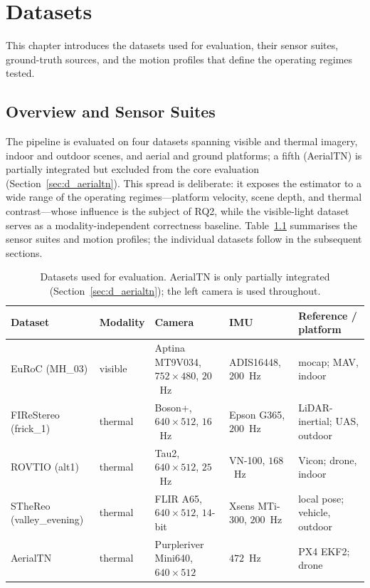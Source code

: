 \chapter{Datasets}
\label{ch:datasets}

This chapter introduces the datasets used for evaluation, their sensor suites, ground-truth sources, and the motion profiles that define the operating regimes tested.

\section{Overview and Sensor Suites}
\label{sec:d_overview}
The pipeline is evaluated on four datasets spanning visible and thermal imagery, indoor and outdoor scenes, and aerial and ground platforms; a fifth (AerialTN) is partially integrated but excluded from the core evaluation (Section~\ref{sec:d_aerialtn}). This spread is deliberate: it exposes the estimator to a wide range of the operating regimes---platform velocity, scene depth, and thermal contrast---whose influence is the subject of RQ2, while the visible-light dataset serves as a modality-independent correctness baseline. Table~\ref{tab:d_overview} summarises the sensor suites and motion profiles; the individual datasets follow in the subsequent sections.

\begin{table}[htbp]
\centering
\footnotesize
\setlength{\tabcolsep}{5pt}
\caption{Datasets used for evaluation. AerialTN is only partially integrated (Section~\ref{sec:d_aerialtn}); the left camera is used throughout.}
\label{tab:d_overview}
\begin{tabularx}{\textwidth}{@{}l l >{\raggedright\arraybackslash}X l >{\raggedright\arraybackslash}X@{}}
\toprule
\textbf{Dataset} & \textbf{Modality} & \textbf{Camera} & \textbf{IMU} & \textbf{Reference / platform} \\
\midrule
EuRoC (MH\_03)            & visible  & Aptina MT9V034, $752\times480$, $20$~Hz         & ADIS16448, $200$~Hz     & mocap; MAV, indoor \\
FIReStereo (frick\_1)     & thermal  & Boson+, $640\times512$, $16$~Hz & Epson G365, $200$~Hz    & LiDAR-inertial; UAS, outdoor \\
ROVTIO (alt1)             & thermal  & Tau2, $640\times512$, $25$~Hz   & VN-100, $168$~Hz        & Vicon; drone, indoor \\
STheReo (valley\_evening) & thermal  & FLIR A65, $640\times512$, $14$-bit                & Xsens MTi-300, $200$~Hz & local pose; vehicle, outdoor \\
AerialTN                  & thermal  & Purpleriver Mini640, $640\times512$ & $472$~Hz                & PX4 EKF2; drone \\
\bottomrule
\end{tabularx}
\end{table}


